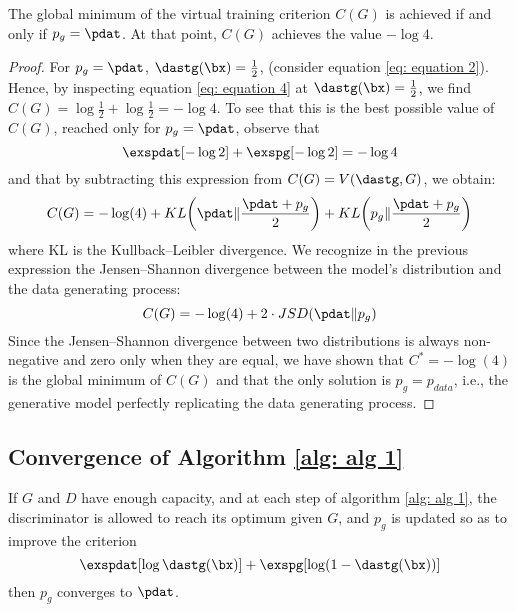 \begin{theorem}
	The global minimum of the virtual training criterion $C(G)$ is achieved if and only if $p_g=\pdat$. At that point, $C(G)$ achieves the value $-\log4$.\label{thm: theorem 1}
\end{theorem}

\begin{proof}
	For $p_g=\pdat$, $\dastg(\bx)=\frac{1}{2}$, (consider equation \ref{eq: equation 2}). Hence, by inspecting equation \ref{eq: equation 4} at $\dastg(\bx)=\frac{1}{2}$, we find $C(G)=\log\frac{1}{2}+\log\frac{1}{2}=-\log4$. To see that this is the best possible value of $C(G)$, reached only for $p_g=\pdat$, observe that
	\begin{equation*}
		\exspdat[-\log2]+\exspg[-\log2]=-\log4
	\end{equation*}
	and that by subtracting this expression from $C(G)=V(\dastg,G)$, we obtain:
	\begin{equation}
		C(G)=-\log(4)+KL\bigg(\pdat\Vert\frac{\pdat+p_g}{2}\bigg)+KL\bigg(p_g\Vert\frac{\pdat+p_g}{2}\bigg)
	\end{equation}
	where KL is the Kullback–Leibler divergence. We recognize in the previous expression the Jensen–Shannon divergence between the model’s distribution and the data generating process:
	\begin{equation}
		C(G)=-\log(4)+2\cdot JSD(\pdat\Vert p_g)
	\end{equation}
	Since the Jensen–Shannon divergence between two distributions is always non-negative and zero only when they are equal, we have shown that $C^{\ast}=-\log(4)$ is the global minimum of $C(G)$ and that the only solution is $p_g=p_{data}$, i.e., the generative model perfectly replicating the data generating process.
\end{proof}

\subsection{Convergence of Algorithm \ref{alg: alg 1}}\label{sec: convergence}
\begin{proposition}
	If $G$ and $D$ have enough capacity, and at each step of algorithm \ref{alg: alg 1}, the discriminator is allowed to reach its optimum given $G$, and $p_g$ is updated so as to improve the criterion
	\begin{equation*}
		\exspdat[\log\dastg(\bx)] + \exspg[\log(1-\dastg(\bx))]
	\end{equation*}
	then $p_g$ converges to $\pdat$.
\end{proposition}

